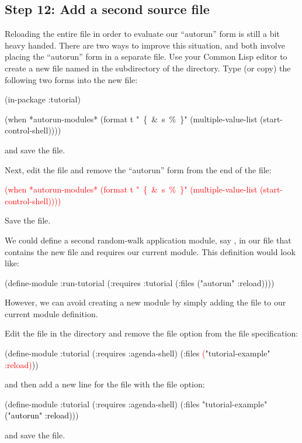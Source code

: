 \documentclass[10pt,twoside,english,pdftex]{article}
\begin{document}
\subsection*{Step 12: Add a second source file}

Reloading the entire  file in order to evaluate our
``autorun'' form is still a bit heavy handed.  There are two ways to improve
this situation, and both involve placing the ``autorun'' form in a separate
file.  Use your Common Lisp editor to create a new file named
 in the  subdirectory of the 
directory. Type (or copy) the following two forms into the new
 file:
%
\W\supp
\begin{example}
  (in-package :tutorial)

  (when *autorun-modules*
    (format t "~\{~\&~s~\%~\}" (multiple-value-list (start-control-shell))))
\end{example}
%
and save the file.  

Next, edit the  file and remove the ``autorun''
form from the end of the file:
% 
\W\supp
\begin{example}
\textcolor{red}{%
  (when *autorun-modules* 
    (format t "~\{~\&~s~\%~\}" (multiple-value-list (start-control-shell))))}
\end{example}
%
Save the file. 

We could define a second random-walk application module, say
, in our  file that contains the new
 file and requires our current  module.
This definition would look like:
%
\W\supp
\begin{example}
\textcolor{darkergray}{%
  (define-module :run-tutorial
    (:requires :tutorial
    (:files ("autorun" :reload))))}
\end{example}
%
However, we can avoid creating a new module by simply adding the
 file to our current  module definition.  

Edit the  file in the  directory and remove
the  file option from the  file
specification:
%
\W\supp
\begin{example}
\textcolor{darkergray}{%
  (define-module :tutorial
    (:requires :agenda-shell)
    (:files \textcolor{red}{(}"tutorial-example" \textcolor{red}{:reload)}))}
\end{example}
%
and then add a new line for the  file with the 
file option:
%
\W\supp\notpretop
\begin{example}
\textcolor{darkergray}{%
  (define-module :tutorial
    (:requires :agenda-shell)
    (:files "tutorial-example"
            \textcolor{black}{("autorun" :reload)}))}
\end{example}
%
and save the file.
\end{document}

